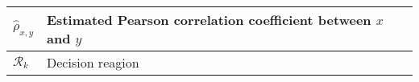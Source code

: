 \begin{xltabular}{\textwidth}{XX}
	\(\hat{\rho}_{x,y}\)                                                                                                                                                           & Estimated Pearson correlation coefficient between \(x\) and \(y\)                                                                                                                                                                                                                                                                      \\ \hline
	\(\mathcal{R}_k\)                                                                                                                                                           & Decision reagion                                                                                                                                                                                                                                                                      \\ \hline
\end{xltabular}


